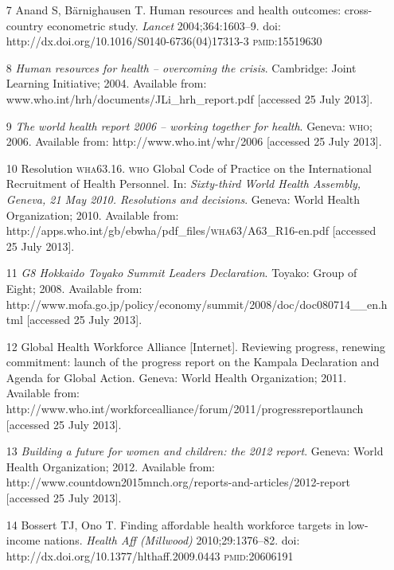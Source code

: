 \documentclass{article}
\begin{document}
\begin{itemize}
\item[7] Anand S, Bärnighausen T. Human resources and health outcomes:
cross-country
econometric study. \textit{Lancet}
2004;364:1603–9. doi:
http://dx.doi.org/10.1016/S0140-6736(04)17313-3 \textsc{pmid}:15519630

\item[8] \textit{Human resources for health – overcoming the crisis}. Cambridge:
Joint Learning Initiative; 2004. Available from:
www.who.int/hrh/documents/JLi\_{}hrh\_{}report.pdf
[accessed 25 July 2013].

\item[9] \textit{The world health report 2006 – working together for health}. Geneva:
\textsc{who}; 2006. Available from: http://www.who.int/whr/2006 [accessed 25 July 2013].

\item[10] Resolution \textsc{wha}63.16. \textsc{who} Global Code of Practice on the International
Recruitment of
Health Personnel. In: \textit{Sixty-third World Health Assembly, Geneva, 21 May
2010. Resolutions
and decisions}. Geneva: World Health Organization; 2010. Available from:
http://apps.who.int/gb/ebwha/pdf\_{}files/\textsc{wha}63/A63\_{}R16-en.pdf [accessed 25
July
2013].

\item[11] \textit{G8 Hokkaido Toyako Summit Leaders Declaration}. Toyako: Group of
Eight; 2008. Available from:
http://www.mofa.go.jp/policy/economy/summit/2008/doc/doc080714\_{}\_{}en.html
[accessed 25 July 2013].

\item[12] Global Health Workforce Alliance [Internet]. Reviewing progress,
renewing
commitment: launch of the progress report on the Kampala Declaration and Agenda
for Global Action.
Geneva: World Health Organization; 2011. Available from:
http://www.who.int/workforcealliance/forum/2011/progressreportlaunch [accessed
25 July
2013].

\item[13] \textit{Building a future for women and children: the 2012 report}. Geneva:
World Health Organization; 2012. Available from:
http://www.countdown2015mnch.org/reports-and-articles/2012-report [accessed 25
July
2013].

\item[14] Bossert TJ, Ono T. Finding affordable health workforce targets in
low-income
nations. \textit{Health Aff (Millwood)}
2010;29:1376–82. doi:
http://dx.doi.org/10.1377/hlthaff.2009.0443 \textsc{pmid}:20606191


\end{itemize}
\end{document}
